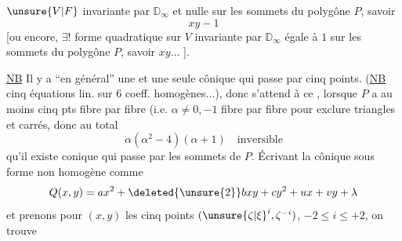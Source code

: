   $\unsure{V|F}$ invariante par $\mathbb D_\infty$ et nulle sur les sommets du polygône $P$, savoir
\[
xy-1
\]
[ou encore, $\exists!$ forme quadratique sur $V$ invariante par $\mathbb D_\infty$ égale à $1$ sur les sommets du polygône $P$, savoir $xy\ldots$ ].

\uline{NB} Il y a ``en général'' une et une seule cônique qui passe par cinq points. (\uline{NB} cinq équations lin.  sur $6$ coeff. homogènes...), donc  s'attend à ce , lorsque $P$ a au moins cinq pts fibre par fibre (i.e. $\alpha\ne0,-1$ fibre par fibre pour exclure triangles et carrés, donc au total
\[
\alpha(\alpha^2-4)(\alpha+1)\quad\text{inversible}
\]
qu'il existe \deleted{\unsure{$\exists$}} conique qui passe par les sommets de $P$. Écrivant la cônique sous forme non homogène comme
\[
Q(x,y)=ax^2+\deleted{\unsure{2}}bxy+cy^2+ux+vy+\lambda
\]
et prenons pour $(x,y)$ les cinq points $({\unsure{\zeta|\xi}}^i,\zeta^{-i})$, $-2\leq i\leq+2$, on trouve
